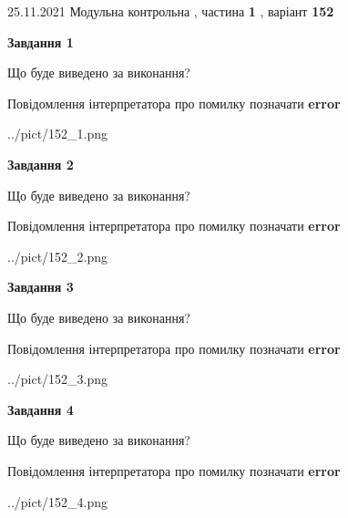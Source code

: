 \documentclass[10pt, ukrainian]{article}
\begin{document}
{25.11.2021 Модульна контрольна , частина \textbf { 1 }, варіант  \No \textbf { 152 }\par}
{
\begin {large}

{\begin {center}\textbf{Завдання 1}\end {center}}\par
Що буде виведено за виконання? \par
Повідомлення інтерпретатора про помилку позначати \textbf{error}

\begin{center}
	{../pict/152_1.png}
\end{center}
\newpage

{\begin {center}\textbf{Завдання 2}\end {center}}\par
Що буде виведено за виконання? \par
Повідомлення інтерпретатора про помилку позначати \textbf{error}

\begin{center}
	{../pict/152_2.png}
\end{center}
\newpage

{\begin {center}\textbf{Завдання 3}\end {center}}\par
Що буде виведено за виконання? \par
Повідомлення інтерпретатора про помилку позначати \textbf{error}

\begin{center}
	{../pict/152_3.png}
\end{center}
\newpage

{\begin {center}\textbf{Завдання 4}\end {center}}\par
Що буде виведено за виконання? \par
Повідомлення інтерпретатора про помилку позначати \textbf{error}

\begin{center}
	{../pict/152_4.png}
\end{center}
\newpage


\end{large}}
\end{document}
